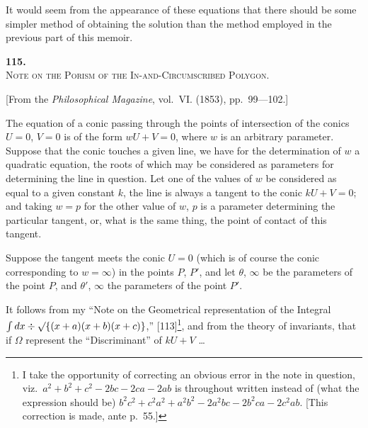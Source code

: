 \documentclass[11pt]{article}
\begin{document}
It would seem from the appearance of these equations that there should be some simpler method of obtaining the solution than the method employed in the previous part of this memoir.


\newpage
\setcounter{page}{87}

\begin{center}
{\Large\bfseries 115.}\\[0.5em]
{\large\scshape Note on the Porism of the In-and-Circumscribed Polygon.}
\end{center}
\vspace{0.3em}
\begin{center}
\small [From the \textit{Philosophical Magazine}, vol.~VI. (1853), pp.~99---102.]
\end{center}
\vspace{0.5em}

The equation of a conic passing through the points of intersection of the conics $U=0$, $V=0$ is of the form $wU+V=0$, where $w$ is an arbitrary parameter. Suppose that the conic touches a given line, we have for the determination of $w$ a quadratic equation, the roots of which may be considered as parameters for determining the line in question. Let one of the values of $w$ be considered as equal to a given constant $k$, the line is always a tangent to the conic $kU+V=0$; and taking $w=p$ for the other value of $w$, $p$ is a parameter determining the particular tangent, or, what is the same thing, the point of contact of this tangent.

Suppose the tangent meets the conic $U=0$ (which is of course the conic corresponding to $w=\infty$) in the points $P$, $P'$, and let $\theta$, $\infty$ be the parameters of the point $P$, and $\theta'$, $\infty$ the parameters of the point $P'$.

It follows from my ``Note on the Geometrical representation of the Integral $\int dx\div\surd\{(x+a)(x+b)(x+c)\}$,'' [113]\footnote{I take the opportunity of correcting an obvious error in the note in question, viz.\ $a^2+b^2+c^2-2bc-2ca-2ab$ is throughout written instead of (what the expression should be) $b^2c^2+c^2a^2+a^2b^2-2a^2bc-2b^2ca-2c^2ab$. [This correction is made, ante p.~55.]}, and from the theory of invariants, that if $\Omega$ represent the ``Discriminant'' of $kU+V$ \ldots
\end{document}
